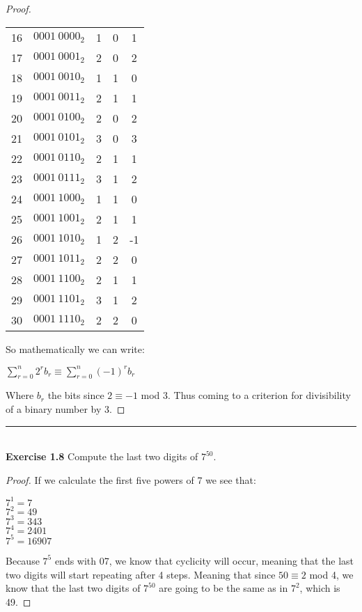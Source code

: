 \documentclass[a4paper]{article}
\begin{document}
\begin{proof}
\begin{center}
{\begin{tabular}{ c c c c c  }
 16 & $0001\ 0000_2$ & 1 & 0 & 1 \\ 
 17 & $0001\ 0001_2$ & 2 & 0 & 2 \\ 
 18 & $0001\ 0010_2$ & 1 & 1 & 0 \\ 
 19 & $0001\ 0011_2$ & 2 & 1 & 1 \\ 
 20 & $0001\ 0100_2$ & 2 & 0 & 2 \\ 
 21 & $0001\ 0101_2$ & 3 & 0 & 3 \\ 
 22 & $0001\ 0110_2$ & 2 & 1 & 1 \\ 
 23 & $0001\ 0111_2$ & 3 & 1 & 2 \\ 
 24 & $0001\ 1000_2$ & 1 & 1 & 0 \\ 
 25 & $0001\ 1001_2$ & 2 & 1 & 1 \\ 
 26 & $0001\ 1010_2$ & 1 & 2 & -1 \\ 
 27 & $0001\ 1011_2$ & 2 & 2 & 0 \\ 
 28 & $0001\ 1100_2$ & 2 & 1 & 1 \\ 
 29 & $0001\ 1101_2$ & 3 & 1 & 2 \\ 
 30 & $0001\ 1110_2$ & 2 & 2 & 0
\end{tabular}}
\end{center}
So mathematically we can write:
\begin{center}
	$\sum_{r=0}^{n} 2^{r}b_{r} \equiv \sum_{r=0}^{n} {(-1)}^{r}b_{r}$
\end{center}
Where $b_{r}$ the bits since $2 \equiv -1$ mod 3. Thus coming to a criterion for divisibility of a binary number by 3.
\end{proof}



\noindent\rule{12cm}{0.4pt}\\
\noindent \textbf{Exercise 1.8} Compute the last two digits of $7^{50}$.
\begin{proof}
	If we calculate the first five powers of 7 we see that:
\begin{center}
	$7^1 = 7$\\
	$7^2 = 49$\\
	$7^3 = 343$\\
	$7^4 = 2401$\\
	$7^5 = 16907$
\end{center}
Because $7^5$ ends with 07, we know that cyclicity will occur, meaning that the last two digits will start repeating after 4 steps. Meaning that since $50 \equiv 2$ mod 4, we know that the last two digits of $7^{50}$ are going to be the same as in $7^2$, which is 49.
\end{proof}
\end{document}
